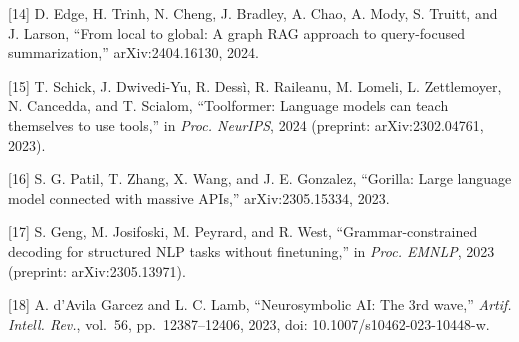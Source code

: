 \documentclass[
]{article}
\begin{document}
{[}14{]} D. Edge, H. Trinh, N. Cheng, J. Bradley, A. Chao, A. Mody, S.
Truitt, and J. Larson, ``From local to global: A graph RAG approach to
query-focused summarization,'' arXiv:2404.16130, 2024.

{[}15{]} T. Schick, J. Dwivedi-Yu, R. Dessì, R. Raileanu, M. Lomeli, L.
Zettlemoyer, N. Cancedda, and T. Scialom, ``Toolformer: Language models
can teach themselves to use tools,'' in \emph{Proc. NeurIPS}, 2024
(preprint: arXiv:2302.04761, 2023).

{[}16{]} S. G. Patil, T. Zhang, X. Wang, and J. E. Gonzalez, ``Gorilla:
Large language model connected with massive APIs,'' arXiv:2305.15334,
2023.

{[}17{]} S. Geng, M. Josifoski, M. Peyrard, and R. West,
``Grammar-constrained decoding for structured NLP tasks without
finetuning,'' in \emph{Proc. EMNLP}, 2023 (preprint: arXiv:2305.13971).

{[}18{]} A. d'Avila Garcez and L. C. Lamb, ``Neurosymbolic AI: The 3rd
wave,'' \emph{Artif. Intell. Rev.}, vol.~56, pp.~12387--12406, 2023,
doi: 10.1007/s10462-023-10448-w.
\end{document}
